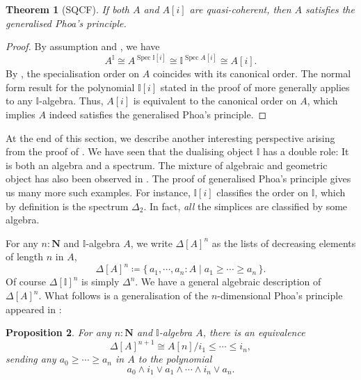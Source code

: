 \documentclass[12pt]{amsart}
\newtheorem{theorem}{Theorem}[section]
\newtheorem{proposition}[theorem]{Proposition}
\theoremstyle{definition}
\newcommand{\mb}[1]{\mathbf{#1}}
\newcommand{\mbb}[1]{\mathbb{#1}}
\newcommand{\I}{\mbb I}
\newcommand{\scomp}[2]{\{\,#1\mid#2\,\}}
\newcommand{\N}{\mb N}
\newcommand{\spec}{\operatorname{Spec}}
\begin{document}
\begin{theorem}[SQCF]\label{thm:algebraphoa}
  If both $A$ and $A[i]$ are quasi-coherent, then $A$ satisfies the generalised Phoa's principle.
\end{theorem}
\begin{proof}
  By assumption and , we have
  \[ A^\I \cong A^{\spec \I[i]} \cong \I^{\spec A[i]} \cong A[i]. \]
  By , the specialisation order on $A$ coincides with its canonical order. The normal form result for the polynomial $\I[i]$ stated in the proof of  more generally applies to any $\I$-algebra. Thus, $A[i]$ is equivalent to the canonical order on $A$, which implies $A$ indeed satisfies the generalised Phoa's principle.
\end{proof}

At the end of this section, we describe another interesting perspective arising from the proof of . We have seen that the dualising object $\I$ has a double role: It is both an algebra and a spectrum. The mixture of algebraic and geometric object has also been observed in . The proof of generalised Phoa's principle gives us many more such examples. For instance, $\I[i]$ classifies the order on $\I$, which by definition is the spectrum $\Delta_2$. In fact, \emph{all} the simplices are classified by some algebra.

For any $n : \N$ and $\I$-algebra $A$, we write $\Delta[A]^{n}$ as the lists of decreasing elements of length $n$ in $A$,
\[ \Delta[A]^{n} \coloneq \scomp{a_1,\cdots,a_n : A}{a_1 \ge \cdots \ge a_n}. \]
Of course $\Delta[\I]^n$ is simply $\Delta^n$. We have a general algebraic description of $\Delta[A]^n$. What follows is a generalisation of the $n$-dimensional Phoa's principle appeared in \cite{pugh2025partialmapclassifiersierpinski}:

\begin{proposition}\label{prop:simplicesasalgebra}
  For any $n : \N$ and $\I$-algebra $A$, there is an equivalence 
  \[ \Delta[A]^{n+1} \cong A[n]/i_1 \le \cdots \le i_n, \]
  sending any $a_0 \ge \cdots \ge a_n$ in $A$ to the polynomial 
  \[ a_0 \wedge i_1 \vee a_1 \wedge \cdots \wedge i_n \vee a_n. \]
\end{proposition}
\end{document}
